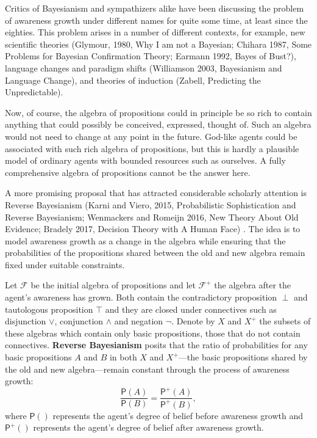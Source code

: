 \documentclass[
  11pt,
  dvipsnames,enabledeprecatedfontcommands]{scrartcl}
\newcommand{\pr}[1]{\ensuremath{\mathsf{P}(#1)}}
\newcommand{\ppr}[2]{\ensuremath{\mathsf{P}^{#1}(#2)}}
\begin{document}
Critics of Bayesianism and sympathizers alike have been discussing the
problem of awareness growth under different names for quite some time,
at least since the eighties. This problem arises in a number of
different contexts, for example, new scientific theories (Glymour, 1980,
Why I am not a Bayesian; Chihara 1987, Some Problems for Bayesian
Confirmation Theory; Earmann 1992, Bayes of Bust?), language changes and
paradigm shifts (Williamson 2003, Bayesianism and Language Change), and
theories of induction (Zabell, Predicting the Unpredictable).

Now, of course, the algebra of propositions could in principle be so
rich to contain anything that could possibly be conceived, expressed,
thought of. Such an algebra would not need to change at any point in the
future. God-like agents could be associated with such rich algebra of
propositions, but this is hardly a plausible model of ordinary agents
with bounded resources such as ourselves. A fully comprehensive algebra
of propositions cannot be the answer here.

A more promising proposal that has attracted considerable scholarly
attention is Reverse Bayesianism (Karni and Viero, 2015, Probabilistic
Sophistication and Reverse Bayesianism; Wenmackers and Romeijn 2016, New
Theory About Old Evidence; Bradely 2017, Decision Theory with A Human
Face) . The idea is to model awareness growth as a change in the algebra
while ensuring that the probabilities of the propositions shared between
the old and new algebra remain fixed under suitable constraints.

Let \(\mathcal{F}\) be the initial algebra of propositions and let
\(\mathcal{F}^+\) the algebra after the agent's awareness has grown.
Both contain the contradictory proposition \(\perp\) and tautologous
proposition \(\top\) and they are closed under connectives such as
disjunction \(\vee\), conjunction \(\wedge\) and negation \(\neg\).
Denote by \(X\) and \(X^+\) the subsets of these algebras which contain
only basic propositions, those that do not contain connectives.
\textbf{Reverse Bayesianism} posits that the ratio of probabilities for
any basic propositions \(A\) and \(B\) in both \(X\) and \(X^+\)---the
basic propositions shared by the old and new algebra---remain constant
through the process of awareness growth:
\[\frac{\pr{A}}{\pr{B}} = \frac{\ppr{+}{A}}{\ppr{+}{B}},\] where
\(\pr{}\) represents the agent's degree of belief before awareness
growth and \(\ppr{+}{}\) represents the agent's degree of belief after
awareness growth.
\end{document}
